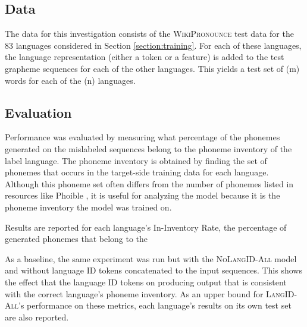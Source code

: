 \subsection{Data}
The data for this investigation consists of the \textsc{WikiPronounce} test data for the 83 languages considered in Section \ref{section:training}. For each of these languages, the language representation (either a token or a feature) is added to the test grapheme sequences for each of the other languages. This yields a test set of (m) words for each of the (n) languages.


\subsection{Evaluation}
Performance was evaluated by measuring what percentage of the phonemes generated on the mislabeled sequences belong to the phoneme inventory of the label language. The phoneme inventory is obtained by finding the set of phonemes that occurs in the target-side training data for each language. Although this phoneme set often differs from the number of phonemes listed in resources like Phoible \citep{phoible}, it is useful for analyzing the model because it is the phoneme inventory the model was trained on. 

Results are reported for each language's In-Inventory Rate, the percentage of generated phonemes that belong to the 


As a baseline, the same experiment was run but with the \textsc{NoLangID-All} model and without language ID tokens concatenated to the input sequences. This shows the effect that the language ID tokens on producing output that is consistent with the correct language's phoneme inventory. As an upper bound for \textsc{LangID-All}'s performance on these metrics, each language's results on its own test set are also reported.

